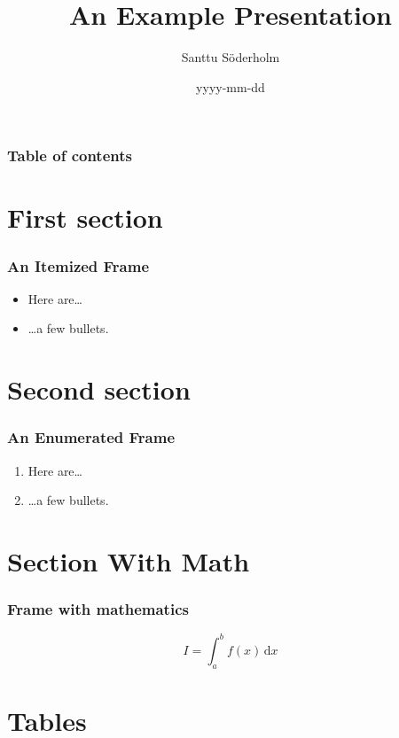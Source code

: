 \documentclass[tikz, aspectratio=169]{beamer}
\title{An Example Presentation}
\date{yyyy-mm-dd}
\author[Söderholm]{Santtu Söderholm}
\begin{document}
\begin{frame}
\titlepage
\end{frame}

\begin{frame}
\frametitle{Table of contents}
\tableofcontents
\end{frame}

\section{First section}

\begin{frame}
\frametitle{An Itemized Frame}
\begin{itemize}
\item Here are\ldots
\item \ldots a few bullets.
\end{itemize}
\end{frame}

\section{Second section}

\begin{frame}
\frametitle{An Enumerated Frame}
\begin{enumerate}
\item Here are\ldots
\item \ldots a few bullets.
\end{enumerate}
\end{frame}

\section{Section With Math}

\begin{frame}
\frametitle{Frame with mathematics}
\begin{equation}
I = \int_a^b f(x) \,\mathrm d x
\end{equation}
\end{frame}

\section{Tables}
\end{document}
